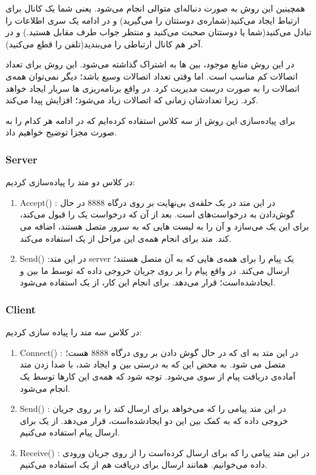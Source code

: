 همچینین این روش به صورت دنباله‌ای متوالی انجام می‌شود. یعنی شما یک کانال برای ارتباط ایجاد می‌کنید(شماره‌ی دوستتان را می‌گیرید) و در ادامه یک سری اطلاعات را تبادل می‌کنید(شما یا دوستتان صحبت می‌کنید و منتظر جواب طرف مقابل هستید.) و در آخر هم کانال ارتباطی را می‌بندید(تلفن را قطع می‌کنید).

در این روش منابع موجود، بین 
ها به اشتراک گذاشته می‌شود. این روش برای تعداد اتصالات کم مناسب است. اما وقتی تعداد اتصالات وسیع باشد؛ دیگر نمی‌توان همه‌ی اتصالات را به صورت درست مدیریت کرد. در واقع برنامه‌ریزی
ها سربار ایجاد خواهد کرد. زیرا تعداد‌شان زمانی که اتصالات زیاد می‌شود؛ افزایش پپدا می‌کند.

برای پیاده‌سازی این روش از سه کلاس استفاده کرده‌ایم که در ادامه هر کدام را به صورت مجزا توضیح خواهیم داد.
\subsubsection{Server}
در کلاس 
دو متد را پیاده‌سازی کردیم:
\begin{enumerate}
	\item Accept()
: در این متد 
در یک حلقه‌ی بی‌نهایت بر روی درگاه 8888 در حال گوش‌دادن به درخواست‌های 
است. بعد از آن که
درخواست یک 
را قبول می‌کند، برای این 
یک 
می‌سازد و آن را به لیست 
هایی که به سرور متصل هستند، اضافه می کند. متد 
برای انجام همه‌ی این مراحل از یک 
استفاده می‌کند.
	\item Send()
	:در این متد server یک پیام را برای همه‌ی 
	هایی که به آن متصل هستند؛ ارسال می‌کند. در واقع پیام را بر روی جریان خروجی داده که توسط 
	ما بین 
	و 
	ایجاد‌شده‌است؛ قرار می‌دهد. برای انجام این کار، از یک 
	استفاده می‌شود.
\end{enumerate}

\subsubsection{Client}
در کلاس 
سه متد را پیاده سازی کردیم:
\begin{enumerate}
	\item Connect()
	: در این متد 
	 به 
‌ای که در حال گوش دادن بر روی درگاه 8888 هست؛ متصل می شود. به محض این که 
	به درستی بین 
	و
	ایجاد شد، 
	با صدا زدن متد
	آماده‌ی دریافت پیام از سوی 
	می‌شود. توجه شود که همه‌ی این کار‌ها توسط یک 
	انجام می‌شود.
	\item Send()
	: در این متد 
	پیامی را که می‌خواهد برای 
	ارسال کند را بر روی جریان خروجی داده که به کمک 
	بین این دو ایجاد‌شده‌است، قرار می‌دهد. از یک 
	برای ارسال پیام استفاده می‌کنیم.
	\item Receive()
	: در این متد پیامی را که 
	برای
	ارسال کرده‌است را از روی جریان ورودی داده می‌خوانیم. همانند ارسال برای دریافت هم از یک 
	استفاده می‌کنیم.
\end{enumerate}

